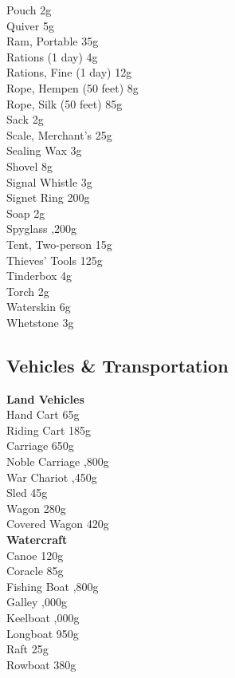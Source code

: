\documentclass[10pt,twoside]{article}
\begin{document}
\begin{multicols}{3}
Pouch \dotfill 2g \\
Quiver \dotfill 5g \\
Ram, Portable \dotfill 35g \\
Rations (1 day) \dotfill 4g \\
Rations, Fine (1 day) \dotfill 12g \\
Rope, Hempen (50 feet) \dotfill 8g \\
Rope, Silk (50 feet) \dotfill 85g \\
Sack \dotfill 2g \\
Scale, Merchant's \dotfill 25g \\
Sealing Wax \dotfill 3g \\
Shovel \dotfill 8g \\
Signal Whistle \dotfill 3g \\
Signet Ring \dotfill 200g \\
Soap \dotfill 2g \\
Spyglass ,200g \\
Tent, Two-person \dotfill 15g \\
Thieves' Tools \dotfill 125g \\
Tinderbox \dotfill 4g \\
Torch \dotfill 2g \\
Waterskin \dotfill 6g \\
Whetstone \dotfill 3g \\
\end{multicols}

\subsection{Vehicles \& Transportation}

\begin{multicols}{2}
\textbf{Land Vehicles} \\
Hand Cart \dotfill 65g \\
Riding Cart \dotfill 185g \\
Carriage \dotfill 650g \\
Noble Carriage ,800g \\
War Chariot ,450g \\
Sled \dotfill 45g \\
Wagon \dotfill 280g \\
Covered Wagon \dotfill 420g \\

\textbf{Watercraft} \\
Canoe \dotfill 120g \\
Coracle \dotfill 85g \\
Fishing Boat ,800g \\
Galley ,000g \\
Keelboat ,000g \\
Longboat \dotfill 950g \\
Raft \dotfill 25g \\
Rowboat \dotfill 380g \\
\end{multicols}
\end{document}
